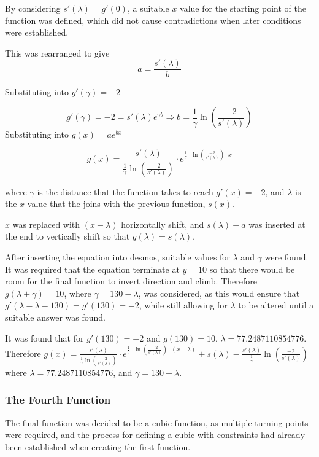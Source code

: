 \documentclass[11pt, letterpaper]{article}
\begin{document}
	

By considering $s'(\lambda)=g'(0)$, a suitable $x$ value for the starting point of the function was defined, which did not cause contradictions when later conditions were established. 

This was rearranged to give $$a=\frac{s'(\lambda)}{b}$$

Substituting into $g'(\gamma)=-2$
 
 $$g'(\gamma)=-2=s'(\lambda)e^{\gamma b}\Rightarrow 
 b=\frac{1}{\gamma}\ln(\frac{-2}{s'(\lambda)})$$ Substituting into $g(x)=ae^{bx}$

 $$g(x)=\frac{s'(\lambda)}{\frac{1}{\gamma}\ln(\frac{-2}{s'(\lambda)})}\cdot e^{\frac{1}{\gamma}\cdot \ln (\frac{-2}{s'(\lambda)})\cdot x}$$ 
 
 where $\gamma$ is the distance that the function takes to reach $g'(x)=-2$, and $\lambda$ is the $x$ value that the joins with the previous function, $s(x)$.
		

$x$ was replaced with $(x-\lambda)$ horizontally shift, and $s(\lambda)-a$ was inserted at the end to vertically shift so that $g(\lambda)=s(\lambda)$.
		

After inserting the equation into desmos, suitable values for $\lambda$ and $\gamma$ were found. It was required that the equation terminate at $y=10$ so that there would be room for the final function to invert direction and climb. Therefore $g(\lambda + \gamma)=10$, where $\gamma=130-\lambda$, was considered, as this would ensure that $g'(\lambda-\lambda-130)=g'(130)=-2$, while still allowing for $\lambda$ to be altered until a suitable answer was found.
		

It was found that for $g'(130)=-2$ and $g(130)=10$, $\lambda=77.2487110854776$. Therefore $g(x)=\frac{s'(\lambda)}{\frac{1}{\gamma}\ln(\frac{-2}{s'(\lambda)})}\cdot e^{\frac{1}{\gamma}\cdot \ln (\frac{-2}{s'(\lambda)})\cdot (x-\lambda)}+s\left(\lambda\right)-\frac{s'(\lambda)}{\frac{1}{\gamma}}\ln\left(\frac{-2}{s'\left(\lambda\right)}\right)$ where $\lambda=77.2487110854776$, and $\gamma=130-\lambda$.





\subsubsection{The Fourth Function}

The final function was decided to be a cubic function, as multiple turning points were required, and the process for defining a cubic with constraints had already been established when creating the first function. 
	
\end{document}
